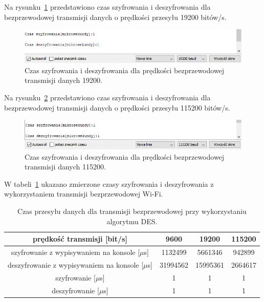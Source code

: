 \documentclass[12p]{article}
\begin{document}
Na rysunku~\ref{19200_wifi} przedstawiono czas szyfrowania i deszyfrowania dla bezprzewodowej transmisji danych o prędkości przesyłu 19200 bitów/s.

\begin{figure}[H]
\centering
\includegraphics[width=12cm]{19200_wifi.png}
\caption{Czas szyfrowania i deszyfrowania dla prędkości bezprzewodowej transmisji danych 19200.}\label{19200_wifi}
\end{figure}

\newpage
Na rysunku~\ref{115200_wifi} przedstawiono czas szyfrowania i deszyfrowania dla bezprzewodowej transmisji danych o prędkości przesyłu 115200 bitów/s.

\begin{figure}[H]
\centering
\includegraphics[width=12cm]{115200_wifi.png}
\caption{Czas szyfrowania i deszyfrowania dla prędkości bezprzewodowej transmisji danych 115200.}\label{115200_wifi}
\end{figure}

W tabeli~\ref{czas_przesylu_wifi} ukazano zmierzone czasy szyfrowania i deszyfrowania z wykorzystaniem transmisji bezprzewodowej Wi-Fi.



\begin{table}[H]
\centering
\begin{tabular}{|c|c|c|c|}
\hline
prędkość transmisji [bit/s] &9600 &19200 &115200\\ \hline

szyfrowanie z wypisywaniem na konsole [$\mu$s]&1132499 &5661346 &942899\\ \hline
deszyfrowanie z wypisywaniem na konsole [$\mu$s]&31994562&15995361 &2664617\\ \hline
szyfrowanie [$\mu$s]&1&1&1\\ \hline%
deszyfrowanie [$\mu$s]&1&1&1\\ \hline
\end{tabular}
\caption{Czas przesyłu danych dla transmisji bezprzewodowej przy wykorzystaniu algorytmu DES.}\label{czas_przesylu_wifi}
\end{table}
\end{document}
